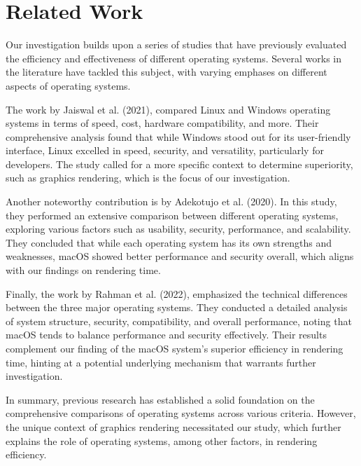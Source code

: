 \documentclass[conference]{IEEEtran}
\begin{document}
\section{Related Work}
Our investigation builds upon a series of studies that have previously evaluated the efficiency and effectiveness of different operating systems. Several works in the literature have tackled this subject, with varying emphases on different aspects of operating systems.

The work by Jaiswal et al. (2021)\cite{b1}, compared Linux and Windows operating systems in terms of speed, cost, hardware compatibility, and more. Their comprehensive analysis found that while Windows stood out for its user-friendly interface, Linux excelled in speed, security, and versatility, particularly for developers. The study called for a more specific context to determine superiority, such as graphics rendering, which is the focus of our investigation.

Another noteworthy contribution is by Adekotujo et al. (2020)\cite{b2}. In this study, they performed an extensive comparison between different operating systems, exploring various factors such as usability, security, performance, and scalability. They concluded that while each operating system has its own strengths and weaknesses, macOS showed better performance and security overall, which aligns with our findings on rendering time.

Finally, the work by Rahman et al. (2022)\cite{b3}, emphasized the technical differences between the three major operating systems. They conducted a detailed analysis of system structure, security, compatibility, and overall performance, noting that macOS tends to balance performance and security effectively. Their results complement our finding of the macOS system's superior efficiency in rendering time, hinting at a potential underlying mechanism that warrants further investigation.

In summary, previous research has established a solid foundation on the comprehensive comparisons of operating systems across various criteria. However, the unique context of graphics rendering necessitated our study, which further explains the role of operating systems, among other factors, in rendering efficiency.

\end{document}
